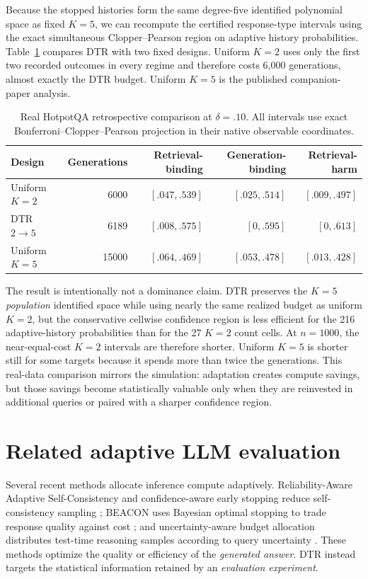 \documentclass[11pt]{article}
\theoremstyle{remark}
\begin{document}
Because the stopped histories form the same degree-five identified polynomial space as fixed $K=5$, we can recompute the certified response-type intervals using the exact simultaneous Clopper--Pearson region on adaptive history probabilities. Table~\ref{tab:hotpotreal} compares DTR with two fixed designs. Uniform $K=2$ uses only the first two recorded outcomes in every regime and therefore costs 6,000 generations, almost exactly the DTR budget. Uniform $K=5$ is the published companion-paper analysis.

\begin{table}[H]
\centering
\caption{Real HotpotQA retrospective comparison at $\delta=.10$. All intervals use exact Bonferroni--Clopper--Pearson projection in their native observable coordinates.}
\label{tab:hotpotreal}
\begin{tabular}{lrrrr}
\toprule
Design & Generations & Retrieval-binding & Generation-binding & Retrieval-harm\\
\midrule
Uniform $K=2$ & 6000 & $[.047,.539]$ & $[.025,.514]$ & $[.009,.497]$\\
DTR $2\to5$ & 6189 & $[.008,.575]$ & $[0,.595]$ & $[0,.613]$\\
Uniform $K=5$ & 15000 & $[.064,.469]$ & $[.053,.478]$ & $[.013,.428]$\\
\bottomrule
\end{tabular}
\end{table}

The result is intentionally not a dominance claim. DTR preserves the $K=5$ \emph{population} identified space while using nearly the same realized budget as uniform $K=2$, but the conservative cellwise confidence region is less efficient for the 216 adaptive-history probabilities than for the 27 $K=2$ count cells. At $n=1000$, the near-equal-cost $K=2$ intervals are therefore shorter. Uniform $K=5$ is shorter still for some targets because it spends more than twice the generations. This real-data comparison mirrors the simulation: adaptation creates compute savings, but those savings become statistically valuable only when they are reinvested in additional queries or paired with a sharper confidence region.

\section{Related adaptive LLM evaluation}

Several recent methods allocate inference compute adaptively. Reliability-Aware Adaptive Self-Consistency and confidence-aware early stopping reduce self-consistency sampling \citep{Kim2026ReASC,Na2026CASE}; BEACON uses Bayesian optimal stopping to trade response quality against cost \citep{Wan2026BEACON}; and uncertainty-aware budget allocation distributes test-time reasoning samples according to query uncertainty \citep{Nguyen2026UAB}. These methods optimize the quality or efficiency of the \emph{generated answer}. DTR instead targets the statistical information retained by an \emph{evaluation experiment}.
\end{document}
